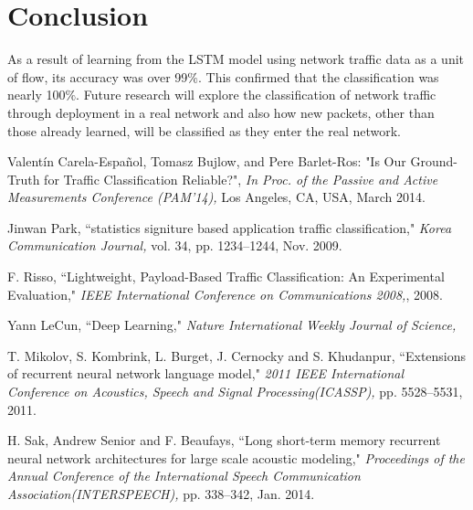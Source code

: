 \documentclass[10pt, twoside, jounal]{IEEEtran}
\begin{document}
\section{Conclusion}
As a result of learning from the LSTM model using network traffic data as a unit of flow, its accuracy was over 99$\%$. This confirmed that the classification was nearly 100$\%$.
Future research will explore the classification of network traffic through deployment in a real network and also how new packets, other than those already learned, will be classified as they enter the real network.

\ifCLASSOPTIONcaptionsoff
  \newpage
\fi



\begin{thebibliography}{1}
Valentín Carela-Español, Tomasz Bujlow, and Pere Barlet-Ros: "Is Our Ground-Truth for Traffic Classification Reliable?",  {\it In Proc. of the Passive and Active Measurements Conference (PAM'14),} Los Angeles, CA, USA, March 2014.

Jinwan Park, ``statistics signiture based application traffic classification," {\it Korea Communication Journal,} vol. 34, pp. 1234--1244, Nov. 2009.

F. Risso, ``Lightweight, Payload-Based Traffic Classification: An Experimental Evaluation," {\it IEEE International Conference on Communications 2008,}, 2008.

Yann LeCun, ``Deep Learning," {\it Nature International Weekly Journal of Science,}

T. Mikolov, S. Kombrink, L. Burget, J. Cernocky and S. Khudanpur, ``Extensions of recurrent neural network language model," {\it 2011 IEEE International Conference on Acoustics, Speech and Signal Processing(ICASSP),} pp. 5528--5531, 2011.

H. Sak, Andrew Senior and F. Beaufays, ``Long short-term memory recurrent neural network architectures for large scale acoustic modeling," {\it Proceedings of the Annual Conference of the International Speech Communication Association(INTERSPEECH),} pp. 338--342, Jan. 2014.








\end{thebibliography}
\end{document}

